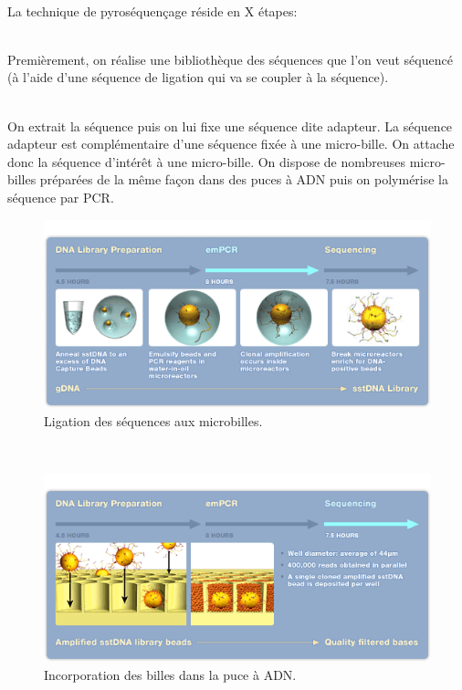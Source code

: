 ~~\\
La technique de pyroséquençage réside en X étapes:

~~\\
Premièrement, on réalise une bibliothèque des séquences que l'on veut séquencé (à l'aide d'une séquence de ligation qui va se coupler à la séquence).

~~\\
On extrait la séquence puis on lui fixe une séquence dite adapteur. La séquence adapteur est complémentaire d'une séquence fixée à une micro-bille. On attache donc la séquence d’intérêt à une micro-bille. On dispose de nombreuses micro-billes préparées de la même façon dans des puces à ADN puis on polymérise la séquence par PCR.
~~\\
\begin{figure}[!h]
 \centering
\includegraphics[scale=0.8]{Images/microbille.png}
\caption{Ligation des séquences aux microbilles.}
\end{figure}
\newpage
~~\\
\begin{figure}[!h]
 \centering
\includegraphics[scale=0.8]{Images/incbil.png}
\caption{Incorporation des billes dans la puce à ADN.}
\end{figure}

